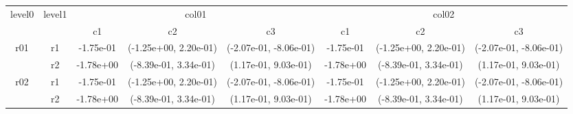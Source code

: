 \begin{tabular}{cccccccc}
\toprule
\multirow{2}{*}{level0} & \multirow{2}{*}{level1}&\multicolumn{3}{c}{col01}&\multicolumn{3}{c}{col02}\tabularnewline
\cmidrule(lr){3-5}
\cmidrule(lr){6-8}
&&c1&c2&c3&c1&c2&c3\tabularnewline
\midrule
\midrule
\multirow{2}{*}{r01}&r1&-1.75e-01& (-1.25e+00, 2.20e-01)& (-2.07e-01, -8.06e-01)&-1.75e-01& (-1.25e+00, 2.20e-01)& (-2.07e-01, -8.06e-01)\tabularnewline
&r2&-1.78e+00& (-8.39e-01, 3.34e-01)& (1.17e-01, 9.03e-01)&-1.78e+00& (-8.39e-01, 3.34e-01)& (1.17e-01, 9.03e-01)\tabularnewline
\midrule
\multirow{2}{*}{r02}&r1&-1.75e-01& (-1.25e+00, 2.20e-01)& (-2.07e-01, -8.06e-01)&-1.75e-01& (-1.25e+00, 2.20e-01)& (-2.07e-01, -8.06e-01)\tabularnewline
&r2&-1.78e+00& (-8.39e-01, 3.34e-01)& (1.17e-01, 9.03e-01)&-1.78e+00& (-8.39e-01, 3.34e-01)& (1.17e-01, 9.03e-01)\tabularnewline
\bottomrule
\end{tabular}
